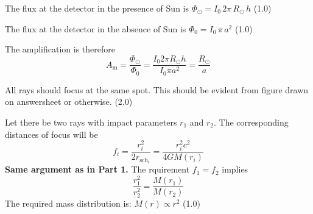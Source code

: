 \begin{description}
The flux at the detector in the presence of Sun is
$\Phi_\odot = I_0\, 2\pi\, R_\odot\, h$ \hfill(1.0)

The flux at the detector in the absence of Sun is
$\Phi_0 = I_0\, \pi\, a^2$ \hfill(1.0)

The amplification is therefore
\[
A_{\mathrm{m}} = \frac{\Phi_\odot}{\Phi_0}
  = \frac{I_0 2\pi R_\odot h}{I_0 \pi a^2}
  = \boxed{\frac{R_\odot}{a}} \tag*{(1.0)}
\]

\item[(T10.3)]
All rays should focus at the same spot. This should be evident from figure
drawn on answersheet or otherwise. \hfill(2.0)

Let there be two rays with impact parameters $r_1$ and $r_2$. The
corresponding distances of focus will be
\[
f_i = \frac{r_i^2}{2r_{\mathrm{sch}_i}} = \frac{r_i^2 c^2}{4GM(r_i)} \tag*{(2.0)}
\]
\textbf{Same argument as in Part 1.} The rquirement %
$f_1 = f_2$ implies
\[
\frac{r_1^2}{r_2^2} = \frac{M(r_1)}{M(r_2)} \tag*{(1.0)}
\]
The required mass distribution is: $\boxed{M(r) \propto r^2}$ \hfill(1.0)
\end{description}
